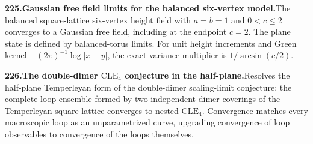 \documentclass[11pt,a4paper]{article}
\begin{document}
  \par \begin{minipage}{\linewidth}
  \fontsize{10.5}{12.6}\selectfont\RaggedRight
  \hypertarget{result 225}{}
  {\bfseries\textcolor{muted}{225.}\enspace Gaussian free field limits for the balanced six-vertex model.}\enspace The balanced square-lattice six-vertex height field with $a=b=1$ and $0<c\le2$ converges to a Gaussian free field, including at the endpoint $c=2$. The plane state is defined by balanced-torus limits. For unit height increments and Green kernel $-(2\pi)^{-1}\log|x-y|$, the exact variance multiplier is $1/\arcsin(c/2)$.\par
  \end{minipage}\par\vspace{5pt}



  \par \begin{minipage}{\linewidth}
  \fontsize{10.5}{12.6}\selectfont\RaggedRight
  \hypertarget{result 226}{}
  {\bfseries\textcolor{muted}{226.}\enspace The double-dimer $\mathrm{CLE}_4$ conjecture in the half-plane.}\enspace Resolves the half-plane Temperleyan form of the double-dimer scaling-limit conjecture: the complete loop ensemble formed by two independent dimer coverings of the Temperleyan square lattice converges to nested $\mathrm{CLE}_4$. Convergence matches every macroscopic loop as an unparametrized curve, upgrading convergence of loop observables to convergence of the loops themselves.\par
  \end{minipage}\par\vspace{5pt}
\end{document}
